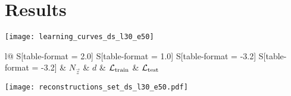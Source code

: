 \section{Results}
\label{sec:results}

\begin{columnfigure}
	\centering
	\texttt{[image: learning\_curves\_ds\_l30\_e50]}
\end{columnfigure}

\begin{center}
	\setlength{\tabcolsep}{1em}
	\begin{tabular}{
			l@{}
			S[table-format = 2.0]
			S[table-format = 1.0]
			S[table-format = -3.2]
			S[table-format = -3.2]
		}
		\toprule
		& {$N_{\vec{z}}$} & {$d$} & {$\mathcal{L}_{\text{train}}$} & {$\mathcal{L}_{\text{test}}$} \\
		\midrule
		
		\bottomrule
	\end{tabular}
\end{center}

\begin{columnfigure}
	\centering
	\texttt{[image: reconstructions\_set\_ds\_l30\_e50.pdf]}
\end{columnfigure}

